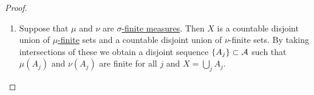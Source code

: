 \begin{proof}
\begin{enumerate}
\begin{proof}
			      Then this says that \(\,\mathrm{d} \lambda - \epsilon \mathbbm{1}_{F} \,\mathrm{d} \mu\) is a \hyperref[def:signed-measure]{positive measure}, that is,
			      \[
				      \,\mathrm{d} \nu - f \,\mathrm{d} \mu - \epsilon \mathbbm{1}_{F} \,\mathrm{d} \mu
			      \]
			      is a \hyperref[def:signed-measure]{positive measure}. But, this will break maximality of \(f\), specifically, let
			      \(g(x) = f(x) + \epsilon \mathbbm{1}_{F} (x)\). Then for all \(E \in \mathcal{A}\) we have
			      \[
				      \begin{split}
					      \int_E g \,\mathrm{d} \mu & = \int_E f \,\mathrm{d} \mu + \epsilon\mu(E \cap F)                 \\
					      &= \nu(E) - \lambda(E) + \epsilon \mu(E \cap F)                      \\
					      &\leq \nu(E) - \lambda(E \cap F) + \epsilon\mu(E \cap F) \leq \nu(E)
				      \end{split}
			      \]
			      since \(\lambda(E \cap F) - \epsilon\mu(E \cap F) \geq 0\). Thus, \(g \in \mathscr{F}\). We then see that
			      \[
				      s \geq \int_X g \,\mathrm{d} \mu  = \int_X f \,\mathrm{d} \mu + \int_X \epsilon \mathbbm{1}_{F} \,\mathrm{d} \mu = s + \epsilon\mu(F) > s,
			      \]
			      which is a contradiction.
		      \end{proof}
		      We see that the existence of \(\lambda , f\), and \(\,\mathrm{d} \rho = f \,\mathrm{d} \mu \) is proved. As for uniqueness,
		      if there are \(\lambda ^\prime \) and \(f^\prime \) such that \(\,\mathrm{d} \nu = \,\mathrm{d} \lambda ^\prime + f^\prime \,\mathrm{d} \mu \),
		      we then have
		      \[
			      \,\mathrm{d} \lambda - \,\mathrm{d} \lambda ^\prime = (f^\prime -f)\,\mathrm{d} \mu .
		      \]
		      But we see that \(\lambda -\lambda ^\prime \perp \mu \) while \((f^\prime -f)\,\mathrm{d} \mu \ll \,\mathrm{d} \mu \), hence
		      \[
			      \,\mathrm{d} \lambda -\,\mathrm{d} \lambda ^\prime = (f^\prime -f)\,\mathrm{d} \mu = 0,
		      \]
		      so \(\lambda = \lambda ^\prime \) and \(f = f^\prime \) \hyperref[def:mu-almost-everywhere]{\(\mu \)-a.e.} by \autoref{prop:lec-13}.
		\item Suppose that \(\mu \) and \(\nu \) are \hyperref[def:finite-signed-measure]{\(\sigma\)-finite measures}. Then \(X\) is a countable disjoint union of
		      \hyperref[def:locally-finite]{\(\mu \)-finite} sets and a countable disjoint union of \(\nu \)-finite sets. By taking intersections of these we obtain
		      a disjoint sequence \(\{A_j\}\subset \mathcal{\MakeUppercase{a}} \) such that \(\mu (A_{j} )\) and \(\nu (A_{j} )\) are finite for all \(j\) and \(X = \bigcup_{j} A_{j} \).

\end{enumerate}
\end{proof}
